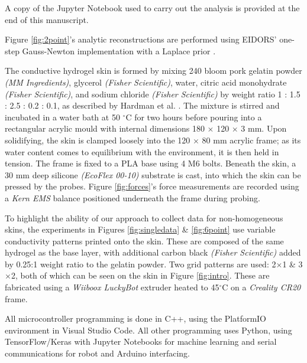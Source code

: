 A copy of the Jupyter Notebook used to carry out the analysis is provided at the end of this manuscript.

Figure \ref{fig:2point}'s analytic reconstructions are performed using EIDORS' one-step Gauss-Newton implementation with a Laplace prior \cite{Adler_2006}.


The conductive hydrogel skin is formed by mixing 240 bloom pork gelatin powder \textit{(MM Ingredients)}, glycerol \textit{(Fisher Scientific)}, water, citric acid monohydrate \textit{(Fisher Scientific)}, and sodium chloride \textit{(Fisher Scientific)} by weight ratio 1 : 1.5 : 2.5 : 0.2 : 0.1, as described by Hardman et al. \cite{Hardman2022}. The mixture is stirred and incubated in a water bath at 50 $^{\circ}$C for two hours before pouring into a rectangular acrylic mould with internal dimensions 180 $\times$ 120 $\times$ 3 mm. Upon solidifying, the skin is clamped loosely into the 120 $ \times $ 80 mm acrylic frame; as its water content comes to equilibrium with the environment, it is then held in tension. The frame is fixed to a PLA base using 4 M6 bolts. Beneath the skin, a 30 mm deep silicone \textit{(EcoFlex 00-10)} substrate is cast, into which the skin can be pressed by the probes. Figure \ref{fig:forces}'s force measurements are recorded using a \textit{Kern EMS} balance positioned underneath the frame during probing.

To highlight the ability of our approach to collect data for non-homogeneous skins, the experiments in Figures \ref{fig:singledata} \& \ref{fig:6point} use variable conductivity patterns printed onto the skin. These are composed of the same hydrogel as the base layer, with additional carbon black \textit{(Fisher Scientific)} added by 0.25:1 weight ratio to the gelatin powder. Two grid patterns are used: 2$\times$1 \& 3$\times$2, both of which can be seen on the skin in Figure \ref{fig:intro}. These are fabricated using a \textit{Wiiboox LuckyBot} extruder heated to 45$^\circ$C on a \textit{Creality CR20} frame.

All microcontroller programming is done in C++, using the PlatformIO environment in Visual Studio Code. All other programming uses Python, using TensorFlow/Keras with Jupyter Notebooks for machine learning and serial communications for robot and Arduino interfacing.


